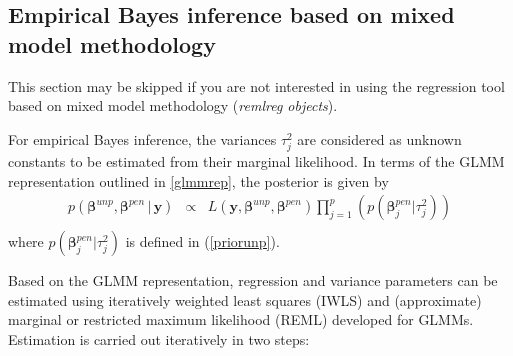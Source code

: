 \documentclass[11pt,a4paper,twoside]{bayesxarticle}
\def \betavec {\boldsymbol{\beta}}
\def \yvec {\mathbf{y}}
\begin{document}
\subsection{Empirical Bayes inference based on mixed model methodology}
\label{glmmmeth}

This section may be skipped if you are not interested in using the
regression tool based on mixed model methodology ({\em remlreg
objects}).

For empirical Bayes inference, the variances $\tau^2_j$ are
considered as unknown constants to be estimated from their marginal
likelihood. In terms of the GLMM representation outlined in
\autoref{glmmrep}, the posterior is given by
\begin{equation}
\label{posterior2}
\begin{array}{lll}
 p(\betavec^{unp},\betavec^{pen}\, | \, \yvec) & \propto & L( \yvec,\betavec^{unp},\betavec^{pen})
\displaystyle \prod_{j=1}^p \left( p(\betavec_j^{pen}|\tau_j^2)  \right) \\
 \end{array}
\end{equation}
where $p(\betavec_j^{pen}|\tau_j^2)$ is defined in (\ref{priorunp}).

Based on the GLMM representation, regression and variance parameters
can be estimated using iteratively weighted least squares (IWLS) and
(approximate) marginal or restricted maximum likelihood (REML)
developed for GLMMs. Estimation is carried out iteratively in two
steps:
\end{document}
